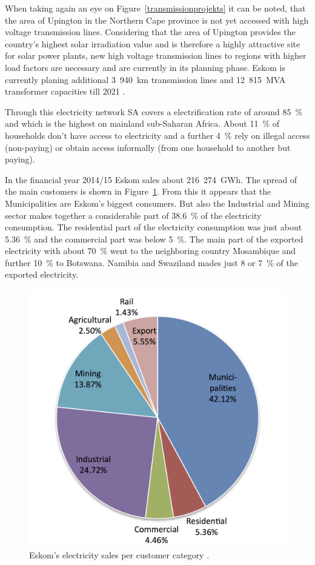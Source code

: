 When taking again an eye on Figure~\ref{transmissionprojekts} it can be noted, that the area of Upington in the Northern Cape province is not yet accessed with high voltage transmission lines. Considering that the area of Upington provides the country’s highest solar irradiation value and is therefore a highly attractive site for solar power plants, new high voltage transmission lines to regions with higher load factors are necessary and are currently in its planning phase. Eskom is currently planing additional 3~940~km  transmission lines and 12~815~MVA transformer capacities till 2021 \cite{Eskom2015a}.

Through this electricity network SA covers a electrification rate of around 85~\% and which is the highest on mainland sub-Saharan Africa. About 11~\% of households don't have access to electricity and a further 4~\% rely on illegal access (non-paying) or obtain access informally (from one household to another but paying). \cite{IEA2014f}

In the financial year 2014/15 Eskom sales about 216~274~GWh. The spread of the main customers is shown in Figure~\ref{ElectricityShare}. From this it appears that the Municipalities are Eskom's biggest consumers. But also the Industrial and Mining sector makes together a considerable part of 38.6~\% of the electricity consumption. The residential part of the electricity consumption was just about 5.36~\% and the commercial part was below 5~\%. The main part of the exported electricity with about 70~\% went to the neighboring country Mosambique and further 10~\% to Botswana. Namibia and Swaziland mades just 8 or 7~\% of the exported electricity. \cite{Eskom2015b}  
\begin{figure}[!h] 
\centering
\includegraphics[width=0.4\linewidth]{FIG/ElectricityShare}
\caption[Eskom's electricity sales per customer category.]{Eskom's electricity sales per customer category \cite{Eskom2015b}.}\label{ElectricityShare}
\end{figure}
\pagebreak
